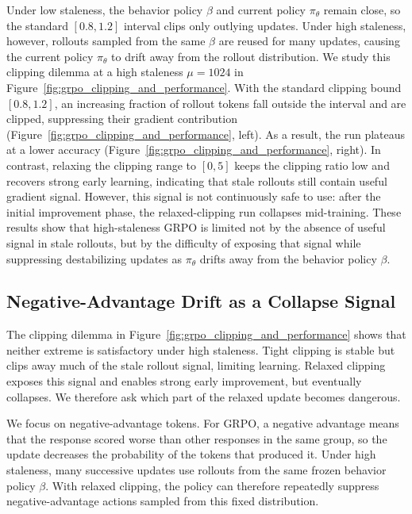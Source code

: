 Under low staleness, the behavior policy $\beta$ and current policy $\pi_\theta$ remain close, so the standard $[0.8,1.2]$ interval clips only outlying updates.
Under high staleness, however, rollouts sampled from the same $\beta$ are reused for many updates, causing the current policy $\pi_\theta$ to drift away from the rollout distribution. We study this clipping dilemma at a high staleness $\mu=1024$ in Figure~\ref{fig:grpo_clipping_and_performance}. With the standard clipping bound $[0.8,1.2]$, an increasing fraction of rollout tokens fall outside the interval and are clipped, suppressing their gradient contribution (Figure~\ref{fig:grpo_clipping_and_performance}, left). As a result, the run plateaus at a lower accuracy (Figure~\ref{fig:grpo_clipping_and_performance}, right). In contrast, relaxing the clipping range to $[0,5]$ keeps the clipping ratio low and recovers strong early learning, indicating that stale rollouts still contain useful gradient signal. However, this signal is not continuously safe to use: after the initial improvement phase, the relaxed-clipping run collapses mid-training.
These results show that high-staleness GRPO is limited not by the absence of useful signal in stale rollouts, but by the difficulty of exposing that signal while suppressing destabilizing updates as $\pi_\theta$ drifts away from the behavior policy $\beta$.

\subsection{Negative-Advantage Drift as a Collapse Signal}
\label{subsec:negative_drift}

The clipping dilemma in Figure~\ref{fig:grpo_clipping_and_performance}
shows that neither extreme is satisfactory under high staleness. Tight clipping
is stable but clips away much of the stale rollout signal, limiting learning.
Relaxed clipping exposes this signal and enables strong early improvement, but
eventually collapses. We therefore ask which part of the relaxed update becomes
dangerous.

We focus on negative-advantage tokens. For GRPO, a negative advantage
means that the response scored worse than other responses in the same group, so
the update decreases the probability of the tokens that produced it. Under high
staleness, many successive updates use rollouts from the same frozen behavior
policy $\beta$. With relaxed clipping, the policy can therefore repeatedly
suppress negative-advantage actions sampled from this fixed distribution.

